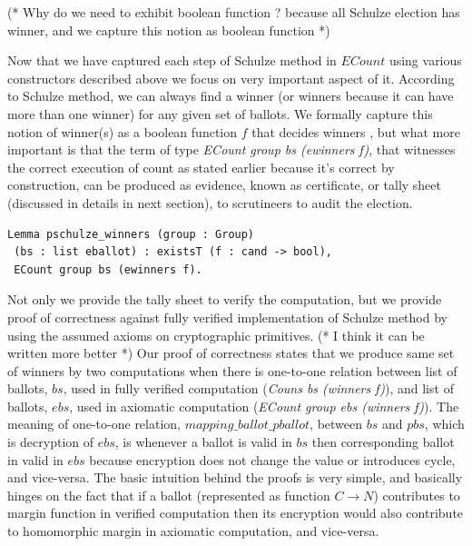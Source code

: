 \documentclass{llncs}
\begin{document}
(* Why do we need to exhibit boolean function ? because all Schulze 
   election has winner, and we capture this notion as boolean function  *)

Now that we have captured each step of Schulze method in $ECount$ using various 
constructors described above we focus on very important aspect of it. 
According to Schulze method, we can always find a winner (or winners because
it can have more  than one winner) for any given set of 
ballots. We formally capture this notion of winner(s) as a boolean 
function $f$ that decides winners \cite{Pattinson:2017:SVE}, but what more
important is 
 that the term of type \textit{ECount group bs (ewinners f)}, 
that witnesses the correct execution of count as stated earlier because it's 
correct by construction, can be produced as evidence, 
known as certificate, or tally sheet (discussed in details in next section), 
to scrutineers to audit the election. 



\begin{lstlisting}[frame=single,basicstyle=\ttfamily\footnotesize]
Lemma pschulze_winners (group : Group) 
 (bs : list eballot) : existsT (f : cand -> bool), 
 ECount group bs (ewinners f).
\end{lstlisting}



Not only we provide the tally sheet  
to verify the computation, but we provide 
proof of correctness against fully verified implementation of 
Schulze method \cite{Pattinson:2017:SVE} by using the 
assumed axioms on cryptographic primitives.
(* I think it can be written more better *) Our proof of correctness
states that we produce same set of winners by two computations 
when there is one-to-one relation between list of ballots, $bs$, used 
in fully verified computation (\textit{Couns bs (winners f)}), and 
list of ballots, $ebs$, used in axiomatic computation 
(\textit{ECount group ebs (winners f)}). 
The meaning of one-to-one relation, $mapping\_ballot\_pballot$, 
between $bs$ and $pbs$, which is decryption of $ebs$, 
is whenever a ballot is valid in $bs$ then 
corresponding ballot in valid in $ebs$ because encryption does not 
change the value or introduces cycle, and vice-versa. The basic 
intuition behind the proofs is very simple, and basically hinges 
on the fact that 
if a ballot (represented as function $C \rightarrow N$)  
contributes to margin function in verified computation then its 
encryption would also contribute to homomorphic margin in 
axiomatic computation, and vice-versa. 
  
\end{document}
